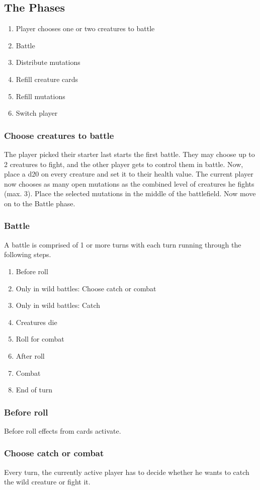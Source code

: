 \documentclass[a4paper,12pt]{article}
\begin{document}
\subsection{The Phases}
\begin{enumerate}
	\item Player chooses one or two creatures to battle
	\item Battle
	\item Distribute mutations 
	\item Refill creature cards
	\item Refill mutations
	\item Switch player
\end{enumerate}

\subsubsection{Choose creatures to battle}
The player picked their starter last starts the first battle. They may choose up to 2 creatures to fight, and the other player gets to control them in battle.
Now, place a d20 on every creature and set it to their health value. The current player now chooses as many open mutations as the combined level of creatures he fights (max. 3). Place the selected mutations in the middle of the battlefield. 
Now move on to the Battle phase.
\subsubsection{Battle}
A battle is comprised of 1 or more turns with each turn running through the following steps.
\begin{enumerate}
	\item Before roll
	\item Only in wild battles: Choose catch or combat
	\item Only in wild battles: Catch
	\item Creatures die
	\item Roll for combat
	\item After roll
	\item Combat
	\item End of turn
\end{enumerate}
\subsubsection{Before roll}
Before roll effects from cards activate.
\subsubsection{Choose catch or combat}
Every turn, the currently active player has to decide whether he wants to catch the wild creature or fight it.
\end{document}

